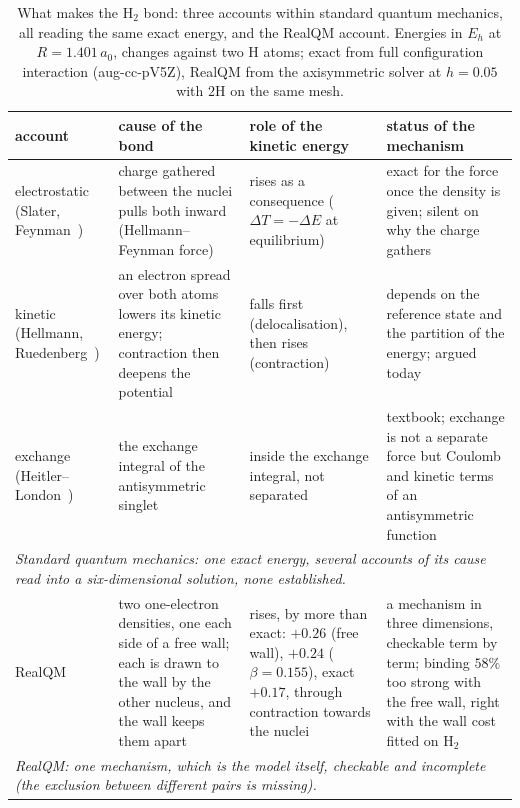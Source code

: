 \documentclass[11pt]{article}
\begin{document}
\begin{table}[ht]
\centering
\small
\renewcommand{\arraystretch}{1.15}
\caption{What makes the H$_2$ bond: three accounts within standard quantum mechanics, all reading the same
exact energy, and the RealQM account. Energies in $E_h$ at $R=1.401\,a_0$, changes against two H atoms; exact
from full configuration interaction (aug-cc-pV5Z), RealQM from the axisymmetric solver at $h=0.05$ with $2$H on
the same mesh.}\label{tab:bondaccounts}
\begin{tabular}{p{}p{}p{}p{}}
\toprule
account & cause of the bond & role of the kinetic energy & status of the mechanism \\
\midrule
electrostatic (Slater, Feynman~\cite{slater,feynman}) & charge gathered between the nuclei pulls both
inward (Hellmann--Feynman force) & rises as a consequence ($\Delta T=-\Delta E$ at equilibrium) & exact
for the force once the density is given; silent on why the charge gathers \\
kinetic (Hellmann, Ruedenberg~\cite{hellmann,ruedenberg,bacskay}) & an electron spread over both atoms
lowers its kinetic energy; contraction then deepens the potential & falls first (delocalisation), then
rises (contraction) & depends on the reference state and the partition of the energy; argued today \\
exchange (Heitler--London~\cite{hl}) & the exchange integral of the antisymmetric singlet & inside the
exchange integral, not separated & textbook; exchange is not a separate force but Coulomb and kinetic
terms of an antisymmetric function \\
\multicolumn{4}{p{0.94\textwidth}}{\emph{Standard quantum mechanics: one exact energy, several accounts of its
cause read into a six-dimensional solution, none established.}} \\
\midrule
RealQM & two one-electron densities, one each side of a free wall; each is drawn to the wall by the other
nucleus, and the wall keeps them apart & rises, by more than exact: $+0.26$ (free wall), $+0.24$
($\beta=0.155$), exact $+0.17$, through contraction towards the nuclei & a mechanism in three dimensions,
checkable term by term; binding $58\%$ too strong with the free wall, right with the wall cost fitted on
H$_2$ \\
\multicolumn{4}{p{0.94\textwidth}}{\emph{RealQM: one mechanism, which is the model itself, checkable and
incomplete (the exclusion between different pairs is missing).}} \\
\bottomrule
\end{tabular}
\end{table}
\end{document}

